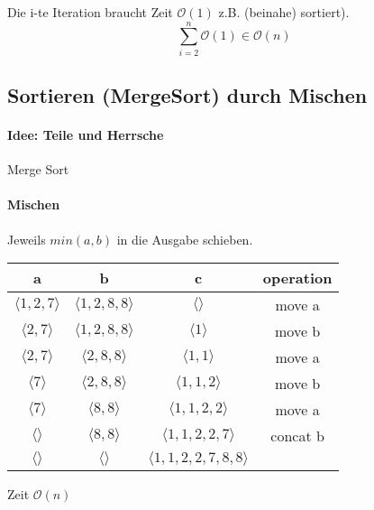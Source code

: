 \documentclass[a4paper]{scrartcl}
\begin{document}
			Die i-te Iteration braucht Zeit \( \mathcal{O}(1) \) z.B. (beinahe) sortiert).
			\[ \sum_{i=2}^{n} \mathcal{O}(1) \in \mathcal{O}(n) \]
	
		\subsection{Sortieren (MergeSort) durch Mischen } 
		\paragraph{Idee: Teile und Herrsche}
		
		\begin{algorithm}[H]
			\caption{Merge Sort}
			\DontPrintSemicolon
		
		\end{algorithm}
		
		
		
		\paragraph{Mischen} 
		Jeweils \( min(a, b) \) in die Ausgabe schieben.
		
		\begin{table}[H]
			\centering
			\begin{tabular}{|c c|c c|}
				\hline
				a&b&c&operation\\
				\hline
				\( \langle 1, 2, 7 \rangle \) & \( \langle 1, 2, 8, 8  \rangle \) &\( \langle   \rangle \) & move a \\
				\( \langle 2, 7 \rangle \) & \( \langle 1, 2, 8, 8  \rangle \) &\( \langle 1  \rangle \) & move  b \\
				\( \langle 2, 7 \rangle \) & \( \langle 2, 8, 8  \rangle \) &\( \langle 1, 1  \rangle \) & move a \\
				\( \langle 7 \rangle \) & \( \langle 2, 8, 8  \rangle \) &\( \langle 1, 1, 2  \rangle \) & move b\\
				\( \langle 7 \rangle \) & \( \langle  8, 8  \rangle \) &\( \langle 1, 1, 2, 2  \rangle \) & move a \\
				\( \langle  \rangle \) & \( \langle  8, 8  \rangle \) &\( \langle 1, 1, 2, 2 , 7  \rangle \) & concat b \\
				\hline
				\( \langle  \rangle \) & \( \langle  \rangle \) &\( \langle 1, 1, 2, 2 , 7, 8, 8  \rangle \) & \\
				\hline
			\end{tabular}
		\end{table}
		Zeit \( \mathcal{O}(n) \)
		
\end{document}

